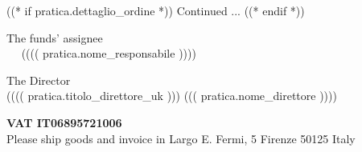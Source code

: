 \documentclass[a4paper,12pt]{letter}
\begin{document}
((* if pratica.dettaglio_ordine *))
\vspace{0.5cm}
\flushright
Continued ...
\newpage
\vspace{2cm}
\quad
((* endif *))

\vspace{1cm}


\begin{minipage}{\textwidth}
\begin{minipage}[t]{8cm}
\begin{center}
The funds' assignee \\
~~ ({}((( pratica.nome_responsabile )))) ~~ \\
\end{center}
\end{minipage}\hfill\begin{minipage}[t]{8cm}
\begin{center}
The Director \\
({}((( pratica.titolo_direttore_uk ))) ((( pratica.nome_direttore )))) \\
\end{center}
\end{minipage}
\begin{center}
\vspace{14mm}

{\small\bf VAT IT06895721006} \\
{\small Please ship goods and invoice in Largo E. Fermi, 5 Firenze 50125 Italy}
\end{center}
\end{minipage}
\end{document}
